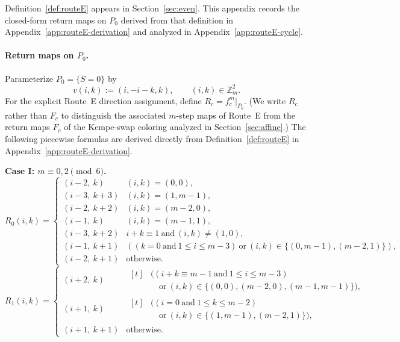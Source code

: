 \documentclass[11pt]{article}
\begin{document}
Definition~\ref{def:routeE} appears in Section~\ref{sec:even}.
This appendix records the closed-form return maps on $P_0$ derived from that definition in Appendix~\ref{app:routeE-derivation} and analyzed in Appendix~\ref{app:routeE-cycle}.

\paragraph{Return maps on $P_0$.}
Parameterize $P_0=\{S=0\}$ by
\[
v(i,k):=(i,-i-k,k),\qquad (i,k)\in\mathbb Z_m^2.
\]
For the explicit Route~E direction assignment, define $R_c=f_c^m|_{P_0}$.
(We write $R_c$ rather than $F_c$ to distinguish the associated $m$-step maps of Route~E from the return maps $F_c$ of the Kempe-swap coloring analyzed in Section~\ref{sec:affine}.)
The following piecewise formulas are derived directly from Definition~\ref{def:routeE} in Appendix~\ref{app:routeE-derivation}.

\medskip
\noindent\textbf{Case I: $m\equiv 0,2\pmod 6$.}
\[
R_0(i,k)=
\begin{cases}
(i-2,\ k) & (i,k)=(0,0),\\
(i-3,\ k+3) & (i,k)=(1,m-1),\\
(i-2,\ k+2) & (i,k)=(m-2,0),\\
(i-1,\ k) & (i,k)=(m-1,1),\\
(i-3,\ k+2) & i+k\equiv 1\ \text{and}\ (i,k)\neq (1,0),\\
(i-1,\ k+1) & ((k=0\ \text{and}\ 1\le i\le m-3)\ \text{or}\ (i,k)\in\{(0,m-1),(m-2,1)\}),\\
(i-2,\ k+1) & \text{otherwise.}
\end{cases}
\]
\[
R_1(i,k)=
\begin{cases}
(i+2,\ k) & \begin{aligned}[t]
            &\bigl( (i+k\equiv m-1\ \text{and}\ 1\le i\le m-3)\\
            &\quad\text{or}\ (i,k)\in\{(0,0),(m-2,0),(m-1,m-1)\} \bigr),
            \end{aligned}\\[2.5ex]
(i+1,\ k) & \begin{aligned}[t]
            &\bigl( (i=0\ \text{and}\ 1\le k\le m-2)\\
            &\quad\text{or}\ (i,k)\in\{(1,m-1),(m-2,1)\} \bigr),
            \end{aligned}\\[2.5ex]
(i+1,\ k+1) & \text{otherwise.}
\end{cases}
\]
\end{document}
